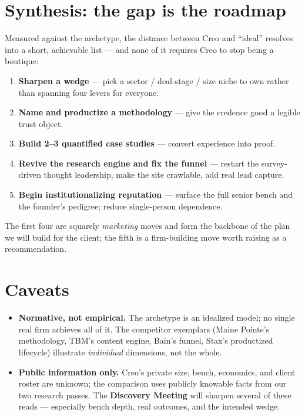 \documentclass[11pt]{article}
\begin{document}
\section{Synthesis: the gap is the roadmap}
Measured against the archetype, the distance between Creo and ``ideal'' resolves into a
short, achievable list --- and none of it requires Creo to stop being a boutique:

\begin{enumerate}
  \item \textbf{Sharpen a wedge} --- pick a sector / deal-stage / size niche to own rather
  than spanning four levers for everyone.
  \item \textbf{Name and productize a methodology} --- give the credence good a legible
  trust object.
  \item \textbf{Build 2--3 quantified case studies} --- convert experience into proof.
  \item \textbf{Revive the research engine and fix the funnel} --- restart the survey-driven
  thought leadership, make the site crawlable, add real lead capture.
  \item \textbf{Begin institutionalizing reputation} --- surface the full senior bench and
  the founder's pedigree; reduce single-person dependence.
\end{enumerate}

\noindent The first four are squarely \emph{marketing} moves and form the backbone of the
plan we will build for the client; the fifth is a firm-building move worth raising as a
recommendation.

\section{Caveats}
\begin{itemize}
  \item \textbf{Normative, not empirical.} The archetype is an idealized model; no single
  real firm achieves all of it. The competitor exemplars (Maine Pointe's methodology, TBM's
  content engine, Bain's funnel, Stax's productized lifecycle) illustrate \emph{individual}
  dimensions, not the whole.
  \item \textbf{Public information only.} Creo's private size, bench, economics, and client
  roster are unknown; the comparison uses publicly knowable facts from our two research
  passes. The \textbf{Discovery Meeting} will sharpen several of these reads --- especially
  bench depth, real outcomes, and the intended wedge.
\end{itemize}
\end{document}
